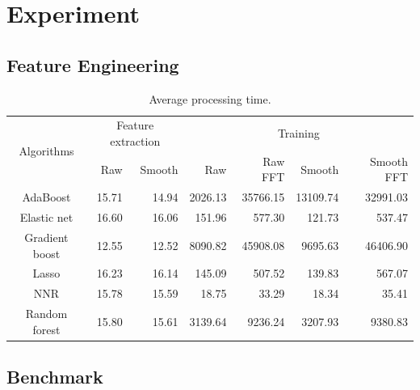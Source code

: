 \section{Experiment}
\label{sec:experiment}
\subsection{Feature Engineering}
\label{sub:feature_engineering}



\begin{table}[htpb]
   \centering
   \caption{Average processing time.}
   \label{tab:timing}
   \begin{tabular}{|c|r|r|r|r|r|r|}
      \hline
      \multirow{2}{*}{Algorithms} & \multicolumn{2}{c|}{Feature extraction} &
      \multicolumn{4}{c|}{Training} \\ \cline{2-7}
                     & Raw   & Smooth & Raw     & Raw FFT  & Smooth   & Smooth FFT \\ \hline
      AdaBoost       & 15.71 & 14.94  & 2026.13 & 35766.15 & 13109.74 & 32991.03\\
      Elastic net    & 16.60 & 16.06  & 151.96  & 577.30   & 121.73   & 537.47\\
      Gradient boost & 12.55 & 12.52  & 8090.82 & 45908.08 & 9695.63  & 46406.90\\
      Lasso          & 16.23 & 16.14  & 145.09  & 507.52   & 139.83   & 567.07\\
      NNR            & 15.78 & 15.59  & 18.75   & 33.29    & 18.34    & 35.41\\
      Random forest  & 15.80 & 15.61  & 3139.64 & 9236.24  & 3207.93  & 9380.83\\
      \hline
   \end{tabular}
\end{table}

\subsection{Benchmark}
\label{sub:benchmark}

